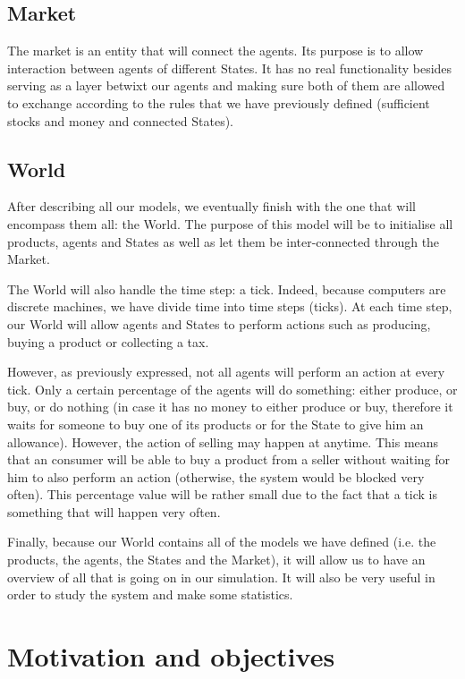 \documentclass[20pt]{article}
\begin{document}
\subsection{Market}\label{section:market}
The market is an entity that will connect the agents. Its purpose is to allow interaction between agents of different States. It has no real functionality besides serving as a layer betwixt our agents and making sure both of them are allowed to exchange according to the rules that we have previously defined (sufficient stocks and money and connected States).

\subsection{World}\label{section:world}
After describing all our models, we eventually finish with the one that will encompass them all: the World. The purpose of this model will be to initialise all products, agents and States as well as let them be inter-connected through the Market.

The World will also handle the time step: a tick. Indeed, because computers are discrete machines, we have divide time into time steps (ticks). At each time step, our World will allow agents and States to perform actions such as producing, buying a product or collecting a tax.

However, as previously expressed, not all agents will perform an action at every tick. Only a certain percentage of the agents will do something: either produce, or buy, or do nothing (in case it has no money to either produce or buy, therefore it waits for someone to buy one of its products or for the State to give him an allowance). However, the action of selling may happen at anytime. This means that an consumer will be able to buy a product from a seller without waiting for him to also perform an action (otherwise, the system would be blocked very often).
This percentage value will be rather small due to the fact that a tick is something that will happen very often.

Finally, because our World contains all of the models we have defined (i.e. the products, the agents, the States and the Market), it will allow us to have an overview of all that is going on in our simulation. It will also be very useful in order to study the system and make some statistics.


\section{Motivation and objectives}\label{section:motivation_objectives}
\end{document}
